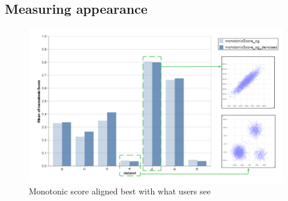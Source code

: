 \documentclass[journal]{vgtc}                     %
\begin{document}
\subsection{Measuring appearance}

\begin{figure}[tbp]%
  \centering %
  \includegraphics[width=\linewidth]{figs/monotonic_score_as_expected.png}
  \caption{%
  	Monotonic score aligned best with what users see %
  }
  \label{fig:monotonic_score}
\end{figure}
\end{document}
